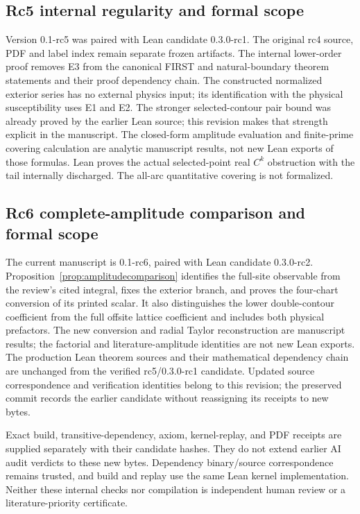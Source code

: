 \subsection*{Rc5 internal regularity and formal scope}
Version 0.1-rc5 was paired with Lean candidate 0.3.0-rc1.
The original rc4 source, PDF and label index remain separate frozen
artifacts. The internal lower-order proof removes E3 from the canonical
FIRST and natural-boundary theorem statements and their proof dependency
chain. The constructed normalized exterior series has no external physics
input; its identification with the physical susceptibility uses E1 and E2.
The stronger selected-contour pair bound was already proved by the earlier
Lean source; this revision makes that strength explicit in the manuscript.
The closed-form amplitude evaluation and finite-prime covering calculation
are analytic manuscript results, not new Lean exports of those formulas.
Lean proves the actual selected-point real \(C^k\) obstruction with the tail
internally discharged. The all-arc quantitative covering is not formalized.

\subsection*{Rc6 complete-amplitude comparison and formal scope}
The current manuscript is 0.1-rc6, paired with Lean candidate 0.3.0-rc2.
Proposition~\ref{prop:amplitudecomparison} identifies the full-site
observable from the review's cited integral, fixes the exterior branch,
and proves the four-chart conversion of its printed scalar. It also
distinguishes the lower double-contour coefficient from the full offsite
lattice coefficient and includes both physical prefactors. The new
conversion and radial Taylor reconstruction are manuscript results;
the factorial and literature-amplitude identities are not new Lean exports.
The production Lean theorem sources and their mathematical dependency
chain are unchanged from the verified rc5/0.3.0-rc1 candidate. Updated
source correspondence and verification identities belong to this revision;
the preserved commit records the earlier candidate without reassigning its
receipts to new bytes.

Exact build, transitive-dependency, axiom, kernel-replay, and PDF receipts
are supplied separately with their candidate hashes. They do not extend
earlier AI audit verdicts to these new bytes. Dependency binary/source
correspondence remains trusted, and build and replay use the same Lean
kernel implementation. Neither these internal checks nor compilation is
independent human review or a literature-priority certificate.

